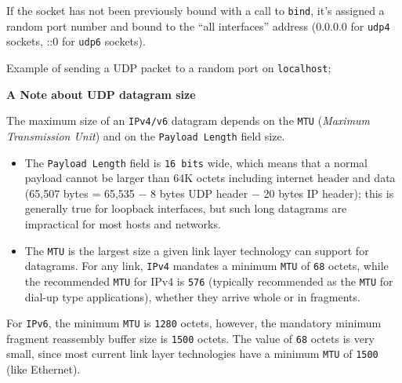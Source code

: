 If the socket has not been previously bound with a call to
\texttt{bind}, it's assigned a random port number and bound to the ``all
interfaces'' address (0.0.0.0 for \texttt{udp4} sockets, ::0 for
\texttt{udp6} sockets).

Example of sending a UDP packet to a random port on \texttt{localhost};

\begin{Shaded}
\begin{Highlighting}[]
 \NormalTok{);}
  \NormalTok{);}
 \NormalTok{(}\NormalTok{);}
\NormalTok{, }\NormalTok{, }\NormalTok{, }\NormalTok{, }
  \NormalTok{();}
\NormalTok{\});}
\end{Highlighting}
\end{Shaded}

\textbf{A Note about UDP datagram size}

The maximum size of an \texttt{IPv4/v6} datagram depends on the
\texttt{MTU} (\emph{Maximum Transmission Unit}) and on the
\texttt{Payload Length} field size.

\begin{itemize}
\item
  The \texttt{Payload Length} field is \texttt{16 bits} wide, which
  means that a normal payload cannot be larger than 64K octets including
  internet header and data (65,507 bytes = 65,535 − 8 bytes UDP header −
  20 bytes IP header); this is generally true for loopback interfaces,
  but such long datagrams are impractical for most hosts and networks.
\item
  The \texttt{MTU} is the largest size a given link layer technology can
  support for datagrams. For any link, \texttt{IPv4} mandates a minimum
  \texttt{MTU} of \texttt{68} octets, while the recommended \texttt{MTU}
  for IPv4 is \texttt{576} (typically recommended as the \texttt{MTU}
  for dial-up type applications), whether they arrive whole or in
  fragments.
\end{itemize}

For \texttt{IPv6}, the minimum \texttt{MTU} is \texttt{1280} octets,
however, the mandatory minimum fragment reassembly buffer size is
\texttt{1500} octets. The value of \texttt{68} octets is very small,
since most current link layer technologies have a minimum \texttt{MTU}
of \texttt{1500} (like Ethernet).

